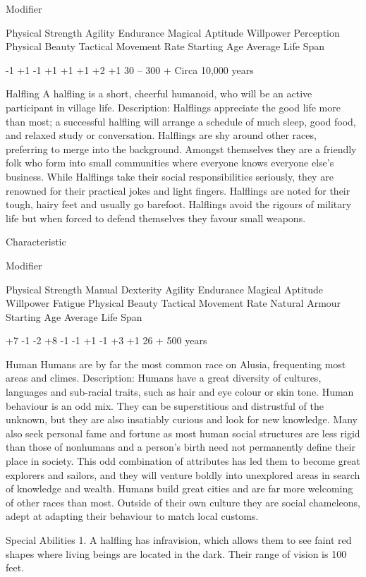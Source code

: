 \documentclass[a4paper]{article}
\begin{document}
\begin{multicols}{3}
Modifier

Physical Strength
Agility
Endurance
Magical Aptitude
Willpower
Perception
Physical Beauty
Tactical Movement Rate
Starting Age
Average Life Span

-1
+1
-1
+1
+1
+1
+2
+1
30 – 300 +
Circa 10,000 years

Halfling
A halfling is a short, cheerful humanoid, who
will be an active participant in village life.
Description: Halflings appreciate the good life
more than most; a successful halfling will arrange a
schedule of much sleep, good food, and relaxed
study or conversation. Halflings are shy around
other races, preferring to merge into the background. Amongst themselves they are a friendly
folk who form into small communities where everyone knows everyone else’s business. While
Halflings take their social responsibilities seriously, they are renowned for their practical jokes
and light fingers. Halflings are noted for their
tough, hairy feet and usually go barefoot. Halflings
avoid the rigours of military life but when forced to
defend themselves they favour small weapons.

Characteristic

Modifier

Physical Strength
Manual Dexterity
Agility
Endurance
Magical Aptitude
Willpower
Fatigue
Physical Beauty
Tactical Movement Rate
Natural Armour
Starting Age
Average Life Span

+7
-1
-2
+8
-1
-1
+1
-1
+3
+1
26 +
500 years

Human
Humans are by far the most common race on
Alusia, frequenting most areas and climes.
Description: Humans have a great diversity of
cultures, languages and sub-racial traits, such as
hair and eye colour or skin tone. Human behaviour
is an odd mix. They can be superstitious and distrustful of the unknown, but they are also insatiably
curious and look for new knowledge. Many also
seek personal fame and fortune as most human
social structures are less rigid than those of nonhumans and a person’s birth need not permanently
define their place in society. This odd combination
of attributes has led them to become great explorers and sailors, and they will venture boldly into
unexplored areas in search of knowledge and
wealth. Humans build great cities and are far more
welcoming of other races than most. Outside of
their own culture they are social chameleons, adept
at adapting their behaviour to match local customs.

Special Abilities
1. A halfling has infravision, which allows them to
see faint red shapes where living beings are located
in the dark. Their range of vision is 100 feet.


\end{multicols}
\end{document}
